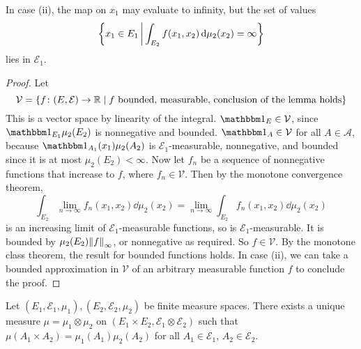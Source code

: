 \begin{remark}
	In case (ii), the map on \( x_1 \) may evaluate to infinity, but the set of values
	\[ \qty{x_1 \in E_1 \,\middle|\,\int_{E_2} f(x_1,x_2) \dd{\mu_2(x_2)} = \infty} \]
	lies in \( \mathcal E_1 \).
\end{remark}
\begin{proof}
	Let
	\[ \mathcal V = \qty{f \colon (E,\mathcal E) \to \mathbb R \mid f \text{ bounded, measurable, conclusion of the lemma holds}} \]
	This is a vector space by linearity of the integral.
	\( \mathbbm 1_E \in \mathcal V \), since \( \mathbbm 1_{E_1} \mu_2(E_2) \) is nonnegative and bounded.
	\( \mathbbm 1_A \in \mathcal V \) for all \( A \in \mathcal A \), because \( \mathbbm 1_{A_1}(x_1) \mu_2(A_2) \) is \( \mathcal E_1 \)-measurable, nonnegative, and bounded since it is at most \( \mu_2(E_2) < \infty \).
	Now let \( f_n \) be a sequence of nonnegative functions that increase to \( f \), where \( f_n \in \mathcal V \).
	Then by the monotone convergence theorem,
	\[ \int_{E_2} \lim_{n \to \infty} f_n(x_1, x_2) \dd{\mu_2(x_2)} = \lim_{n \to \infty} \int_{E_2} f_n(x_1, x_2) \dd{\mu_2(x_2)} \]
	is an increasing limit of \( \mathcal E_1 \)-measurable functions, so is \( \mathcal E_1 \)-measurable.
	It is bounded by \( \mu_2(E_2) \norm{f}_\infty \), or nonnegative as required.
	So \( f \in \mathcal V \).
	By the monotone class theorem, the result for bounded functions holds.
	In case (ii), we can take a bounded approximation in \( \mathcal V \) of an arbitrary measurable function \( f \) to conclude the proof.
\end{proof}
\begin{theorem}
	Let \( (E_1, \mathcal E_1, \mu_1), (E_2, \mathcal E_2, \mu_2) \) be finite measure spaces.
	There exists a unique measure \( \mu = \mu_1 \otimes \mu_2 \) on \( (E_1 \times E_2, \mathcal E_1 \otimes \mathcal E_2) \) such that \( \mu(A_1 \times A_2) = \mu_1(A_1) \mu_2(A_2) \) for all \( A_1 \in \mathcal E_1 \), \( A_2 \in \mathcal E_2 \).
\end{theorem}

